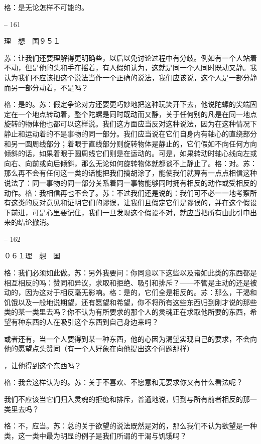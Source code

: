 \documentclass[11pt,oneside]{book}
\begin{document}
\begin{common-format}
    格：是无论怎样不可能的。

    

-- 161

    理　想　国９５１

    苏：让我们还要理解得更明确些，以后以免讨论过程中有分歧。例如有一个人站着不动，但是他的头和手在摇着，有人假如认为，这就是同一个人同时既动又静。我认为我们不应该把这个说法当作一个正确的说法，我们应该说，这个人是一部分静而另一部分动着，不是吗？

    格：是的。苏：假定争论对方还要更巧妙地把这种玩笑开下去，他说陀螺的尖端固定在一个地点转动着，整个陀螺是同时既动而又静，关于任何别的凡是在同一地点旋转的物体他也都可以这样说。我们这方面应当反对这种说法，因为在这种情况下静止和运动着的不是事物的同一部分。我们应当说在它们自身内有轴心的直绕部分和另一圆周线部分；着眼于直线部分则旋转物体是静止的，它们假如不向任何方向倾斜的话，如果着眼于圆周线它们则是在运动的。可是，如果转动时轴心线向左或向右、向前或向后倾斜，那么无论如何旋转物体就都谈不上静止了。格：对。苏：那么再不会有任何这一类的话能把我们搞胡涂了，能使我们就算有一点点相信这种说法了：同一事物的同一部分关系着同一事物能够同时拥有相反的动作或受相反的动作。格：我相信再也不会了。苏：不过我们还是说的：我们可不必一一地考察所有这类的反对意见和证明它们的谬误，让我们且假定它们是谬误的，并在这个假设下前进，可是心里要记住，我们一旦发现这个假设不对，就应当把所有由此引申出来的结论撤消。

    

-- 162

    ０６１理　想　国

    格：我们必须如此做。苏：另外我要问：你同意以下这些以及诸如此类的东西都是相互相反的吗：赞同和异议，求取和拒绝、吸引和排斥？——不管是主动的还是被动的，因为这对于相反毫无影响。格：是的，它们全是相反的。苏：那么，干渴和饥饿以及一般地说期望，还有愿望和希望，你不将所有这些东西归到刚才说的那些类的某一类里去吗？你不认为有所要求的那个人的灵魂正在求取他所要的东西，希望有种东西的人在吸引这个东西到自己身边来吗？

    或者还有，当一个人要得到某一种东西，他的心因为渴望实现自己的要求，不会向他的愿望点头赞同（有一个人好象在向他提出这个问题那样）

    ，让他得到这个东西吗？

    格：我会这样认为的。苏：关于不喜欢、不愿意和无要求你又有什么看法呢？

    我们不应该当它们归入灵魂的拒绝和排斥，普通地说，归到与所有前者相反的那一类里去吗？

    格：不，应当。苏：总的关于欲望的说法既然是对的，那么我们不认为欲望是一种类，这一类中最为明显的例子是我们所谓的干渴与饥饿吗？


\end{common-format}
\end{document}
